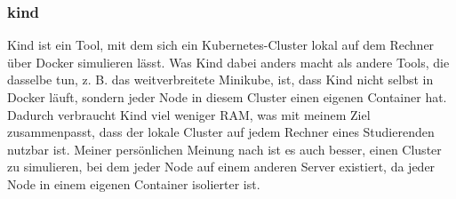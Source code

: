 \subsubsection{kind}

Kind ist ein Tool, mit dem sich ein Kubernetes-Cluster lokal auf dem Rechner über Docker simulieren lässt.
Was Kind dabei anders macht als andere Tools, die dasselbe tun, z. B. das weitverbreitete Minikube, ist, dass Kind nicht selbst in Docker läuft, sondern jeder Node in diesem Cluster einen eigenen Container hat.
Dadurch verbraucht Kind viel weniger RAM, was mit meinem Ziel zusammenpasst, dass der lokale Cluster auf jedem Rechner eines Studierenden nutzbar ist.
Meiner persönlichen Meinung nach ist es auch besser, einen Cluster zu simulieren, bei dem jeder Node auf einem anderen Server existiert, da jeder Node in einem eigenen Container isolierter ist.